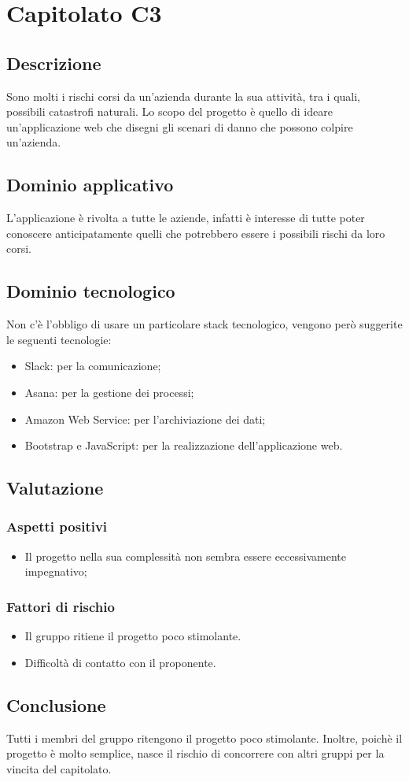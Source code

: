 \section {Capitolato C3}
	\subsection {Descrizione}
		Sono molti i rischi corsi da un'azienda durante la sua attività, tra i quali, possibili catastrofi naturali. Lo scopo del progetto è quello di ideare un'applicazione web che disegni gli scenari di
		danno che possono colpire un'azienda.
	\subsection {Dominio applicativo}
		L'applicazione è rivolta a tutte le aziende, infatti è interesse di tutte poter conoscere anticipatamente quelli che potrebbero essere i possibili rischi da loro corsi.
	\subsection {Dominio tecnologico}
		Non c'è l'obbligo di usare un particolare stack tecnologico, vengono però suggerite le seguenti tecnologie:
		\begin{itemize}
			\item Slack: per la comunicazione;
			\item Asana: per la gestione dei processi;
			\item Amazon Web Service: per l'archiviazione dei dati;
			\item Bootstrap e JavaScript: per la realizzazione dell'applicazione web.
		\end{itemize}
	\subsection {Valutazione}
		\subsubsection {Aspetti positivi}
			\begin{itemize}
				\item Il progetto nella sua complessità non sembra essere eccessivamente impegnativo;
			\end{itemize}
		\subsubsection {Fattori di rischio}
			\begin{itemize}
				\item Il gruppo ritiene il progetto poco stimolante.
				\item Difficoltà di contatto con il proponente.
			\end{itemize}
	\subsection {Conclusione}
		Tutti i membri del gruppo ritengono il progetto poco stimolante. Inoltre, poichè il progetto è molto semplice, nasce il rischio di concorrere con altri gruppi per la vincita del capitolato.